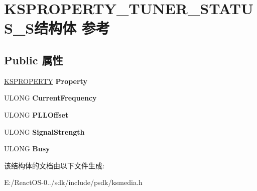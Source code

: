 \hypertarget{struct_k_s_p_r_o_p_e_r_t_y___t_u_n_e_r___s_t_a_t_u_s___s}{}\section{K\+S\+P\+R\+O\+P\+E\+R\+T\+Y\+\_\+\+T\+U\+N\+E\+R\+\_\+\+S\+T\+A\+T\+U\+S\+\_\+\+S结构体 参考}
\label{struct_k_s_p_r_o_p_e_r_t_y___t_u_n_e_r___s_t_a_t_u_s___s}
\subsection*{Public 属性}
\begin{DoxyCompactItemize}
\item 
\mbox{\label{struct_k_s_p_r_o_p_e_r_t_y___t_u_n_e_r___s_t_a_t_u_s___s_a1aa106b2f455577d29edec0fc9bc6b14}} 
\hyperlink{struct_k_s_i_d_e_n_t_i_f_i_e_r}{K\+S\+P\+R\+O\+P\+E\+R\+TY} {\bfseries Property}
\item 
\mbox{\label{struct_k_s_p_r_o_p_e_r_t_y___t_u_n_e_r___s_t_a_t_u_s___s_a22af2a9a80b8795d23846946a9d98159}} 
U\+L\+O\+NG {\bfseries Current\+Frequency}
\item 
\mbox{\label{struct_k_s_p_r_o_p_e_r_t_y___t_u_n_e_r___s_t_a_t_u_s___s_a48fa08dba28867362240006e6895a6bb}} 
U\+L\+O\+NG {\bfseries P\+L\+L\+Offset}
\item 
\mbox{\label{struct_k_s_p_r_o_p_e_r_t_y___t_u_n_e_r___s_t_a_t_u_s___s_a89fa47e685ce5f69b03e0082328210a9}} 
U\+L\+O\+NG {\bfseries Signal\+Strength}
\item 
\mbox{\label{struct_k_s_p_r_o_p_e_r_t_y___t_u_n_e_r___s_t_a_t_u_s___s_a7b5cd14fd8494b6aa7531e5236cce254}} 
U\+L\+O\+NG {\bfseries Busy}
\end{DoxyCompactItemize}


该结构体的文档由以下文件生成\+:\begin{DoxyCompactItemize}
\item 
E\+:/\+React\+O\+S-\/0../sdk/include/psdk/ksmedia.\+h\end{DoxyCompactItemize}
